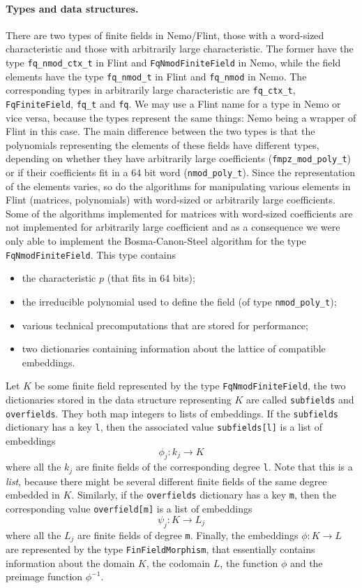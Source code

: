\paragraph{Types and data structures.} There are two types of finite fields in Nemo/Flint,
those with a word-sized characteristic and those with arbitrarily large
characteristic. The former have the type \texttt{fq\_nmod\_ctx\_t} in Flint and
\texttt{FqNmodFiniteField} in Nemo, while the field elements have the type
\texttt{fq\_nmod\_t} in Flint and \texttt{fq\_nmod} in Nemo. The corresponding
types in arbitrarily large characteristic are \texttt{fq\_ctx\_t},
\texttt{FqFiniteField}, \texttt{fq\_t} and
\texttt{fq}. We may use a Flint name for a type in Nemo or vice versa, because
the types represent the same things: Nemo being a wrapper of Flint in this case.
The main difference between the two types is that the polynomials representing the
elements of these fields have different types, depending on whether they have
arbitrarily large coefficients (\texttt{fmpz\_mod\_poly\_t}) or if their
coefficients fit in a $64$ bit word (\texttt{nmod\_poly\_t}). Since the
representation of the elements varies, so do the algorithms for manipulating
various elements in Flint (matrices, polynomials) with word-sized or arbitrarily
large coefficients. Some of the algorithms implemented for matrices with
word-sized coefficients are not implemented for arbitrarily large coefficient and
as a consequence we were only able to implement the Bosma-Canon-Steel algorithm
for the type \texttt{FqNmodFiniteField}. This type contains
\begin{itemize}
  \item the characteristic $p$ (that fits in $64$ bits);
  \item the irreducible polynomial used to define the field (of type
    \texttt{nmod\_poly\_t});
  \item various technical precomputations that are stored for performance;
  \item two dictionaries containing information about the lattice of
    compatible embeddings.
\end{itemize}
Let $K$ be some finite field represented by the type \texttt{FqNmodFiniteField},
the two dictionaries stored in the data structure representing $K$ are called
\texttt{subfields} and \texttt{overfields}. They both map integers to lists of
embeddings. If the \texttt{subfields} dictionary has a key \texttt{l}, then the
associated value \texttt{subfields[l]} is a list of embeddings
\[
  \phi_j: k_j\to K
\]
where all the $k_j$ are finite fields of the corresponding degree
\texttt{l}. Note that this is a \emph{list}, because there might be several
different finite fields of the same degree embedded in $K$. Similarly, if the
\texttt{overfields} dictionary has a key \texttt{m}, then the corresponding
value \texttt{overfield[m]} is a list of embeddings
\[
  \psi_j:K\to L_j
\]
where all the $L_j$ are finite fields of degree \texttt{m}. Finally, the
embeddings $\phi:K\to L$ are represented by the type \texttt{FinFieldMorphism}, that
essentially contains information about the domain $K$, the codomain $L$,
the function $\phi$ and the preimage function $\phi^{-1}$.

